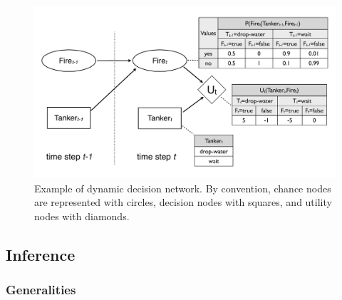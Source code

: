 \begin{figure}[h]
\centering
\includegraphics[scale=0.25]{imgs/ddn.pdf}
\caption{Example of dynamic decision network. By convention, chance nodes are represented with circles, decision nodes with squares, and utility nodes with diamonds. }
\label{fig:ddn}
\end{figure}


\subsection{Inference} 

\subsubsection*{Generalities}

